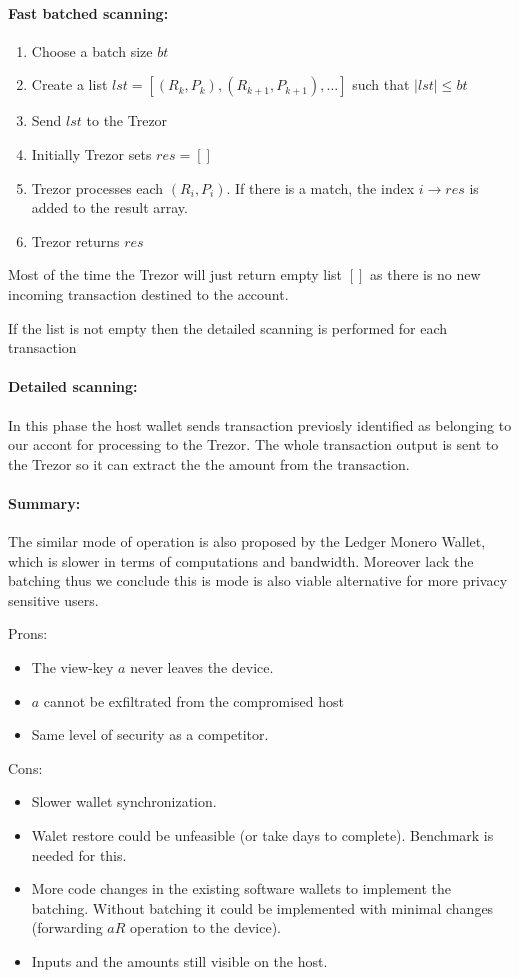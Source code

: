 \documentclass[]{article}
\begin{document}
\paragraph{Fast batched scanning:}
\begin{enumerate}
	\item Choose a batch size $bt$
	\item Create a list $lst = [(R_k, P_k), (R_{k+1}, P_{k+1}), ...]$ such that $|lst| \leq bt$
	\item Send $lst$ to the Trezor
	\item Initially Trezor sets $res = []$
	\item Trezor processes each $(R_i, P_i)$. If there is a match, the index $i \rightarrow res$ is added to the result array.
	\item Trezor returns $res$ 
\end{enumerate}
Most of the time the Trezor will just return empty list $[]$ as there is no new incoming transaction destined to the account. 

If the list is not empty then the detailed scanning is performed for each transaction

\paragraph{Detailed scanning:} In this phase the host wallet sends transaction previosly identified as belonging to our accont for processing to the Trezor. The whole transaction output is sent to the Trezor so it can extract the the amount from the transaction.

\paragraph{Summary:}
The similar mode of operation is also proposed by the Ledger Monero Wallet, which is slower in terms of computations and bandwidth. Moreover lack the batching thus we conclude this is mode is also viable alternative for more privacy sensitive users.

\noindent Prons:
\begin{itemize}
	\item The view-key $a$ never leaves the device.
	\item $a$ cannot be exfiltrated from the compromised host
	\item Same level of security as a competitor.
\end{itemize}

\noindent Cons:
\begin{itemize}
	\item Slower wallet synchronization.
	\item Walet restore could be unfeasible (or take days to complete). Benchmark is needed for this.
	\item More code changes in the existing software wallets to implement the batching. Without batching it could be implemented with minimal changes (forwarding $aR$ operation to the device).
	\item Inputs and the amounts still visible on the host.
\end{itemize}
\end{document}
